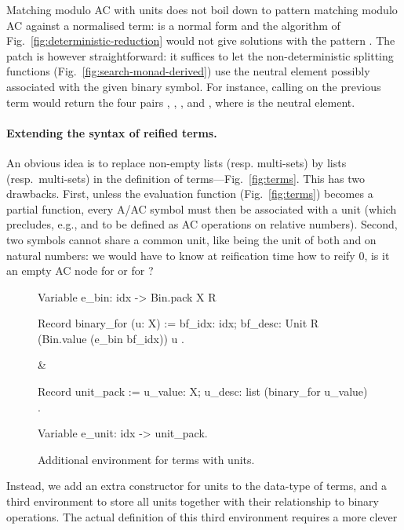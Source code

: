 \documentclass{llncs}
\begin{document}
Matching modulo AC with units does not boil down to pattern matching
modulo AC against a normalised term: 
is a normal form and the algorithm of
Fig.~\ref{fig:deterministic-reduction} would not give solutions with
the pattern . The patch is however
straightforward: it suffices to let the non-deterministic splitting
functions (Fig.~\ref{fig:search-monad-derived}) use the neutral
element possibly associated with the given binary symbol. For
instance, calling  on the previous term would return the
four pairs
, , , and , where  is the
neutral element. 

\paragraph{Extending the syntax of reified terms.}

An obvious idea is to replace non-empty lists (resp. multi-sets) by
lists (resp.\ multi-sets) in the definition of
terms---Fig.~\ref{fig:terms}. This has two drawbacks. First, unless
the evaluation function (Fig.~\ref{fig:terms}) becomes a partial
function, every A/AC symbol must then be associated with a unit (which
precludes, e.g.,  and  to be defined as AC
operations on relative numbers).  Second, two symbols cannot share a
common unit, like  being the unit of both  and
 on natural numbers: we would have to know at reification
time how to reify 0, is it an empty AC node for  or for
?
\begin{figure}[t]
\begin{twolistings}
\begin{coq}
Variable e_bin: idx -> Bin.pack X R      

Record binary_for (u: X) := {            
 bf_idx: idx;                                     
 bf_desc: Unit R (Bin.value (e_bin bf_idx)) u }.
\end{coq}
&
\begin{coq}
Record unit_pack := {
 u_value: X;
 u_desc: list (binary_for u_value) }.    

Variable e_unit: idx -> unit_pack.
\end{coq}
\end{twolistings}
\caption{Additional environment for terms with units.}
\label{fig:dec-syntax}
\end{figure}
Instead, we add an extra constructor for units to the
data-type of terms, and a third environment to store all units
together with their relationship to binary operations.
The actual definition of this third environment requires a more clever
\end{document}
